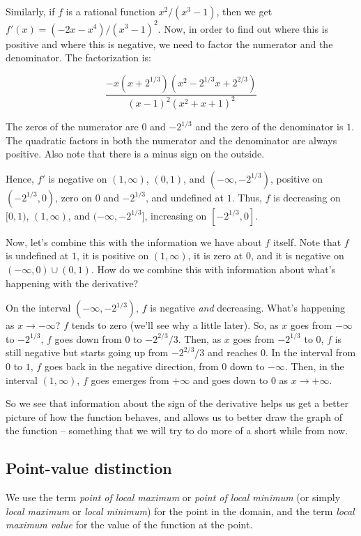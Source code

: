 \documentclass{amsart}
\begin{document}
Similarly, if $f$ is a rational function $x^2/(x^3 - 1)$, then we get
$f'(x) = (-2x - x^4)/(x^3 - 1)^2$. Now, in order to find out where
this is positive and where this is negative, we need to factor the
numerator and the denominator. The factorization is:

$$\frac{-x(x + 2^{1/3})(x^2 - 2^{1/3}x + 2^{2/3})}{(x - 1)^2(x^2 + x + 1)^2}$$

The zeros of the numerator are $0$ and $-2^{1/3}$ and the zero of the
denominator is $1$. The quadratic factors in both the numerator and
the denominator are always positive. Also note that there is a minus
sign on the outside.

Hence, $f'$ is negative on $(1,\infty)$, $(0,1)$, and
$(-\infty,-2^{1/3})$, positive on $(-2^{1/3},0)$, zero on $0$ and
$-2^{1/3}$, and undefined at $1$. Thus, $f$ is decreasing on $[0,1)$,
$(1,\infty)$, and $(-\infty,-2^{1/3}]$, increasing on $[-2^{1/3},0]$.

Now, let's combine this with the information we have about $f$
itself. Note that $f$ is undefined at $1$, it is positive on
$(1,\infty)$, it is zero at $0$, and it is negative on $(-\infty,0)
\cup (0,1)$. How do we combine this with information about what's
happening with the derivative?

On the interval $(-\infty,-2^{1/3})$, $f$ is negative {\em and}
decreasing. What's happening as $x \to -\infty$? $f$ tends to zero
(we'll see why a little later). So, as $x$ goes from $-\infty$ to
$-2^{1/3}$, $f$ goes down from $0$ to $-2^{2/3}/3$. Then, as $x$ goes
from $-2^{1/3}$ to $0$, $f$ is still negative but starts going up from
$-2^{2/3}/3$ and reaches $0$. In the interval from $0$ to $1$, $f$
goes back in the negative direction, from $0$ down to $-\infty$. Then,
in the interval $(1,\infty)$, $f$ goes emerges from $+\infty$ and goes
down to $0$ as $x \to +\infty$.

So we see that information about the sign of the derivative helps us
get a better picture of how the function behaves, and allows us to
better draw the graph of the function -- something that we will try to
do more of a short while from now.

\subsection*{Point-value distinction}

We use the term {\em point of local maximum} or {\em point of local
minimum} (or simply {\em local maximum} or {\em local minimum}) for
the point in the domain, and the term {\em local maximum value} for
the value of the function at the point.
\end{document}
